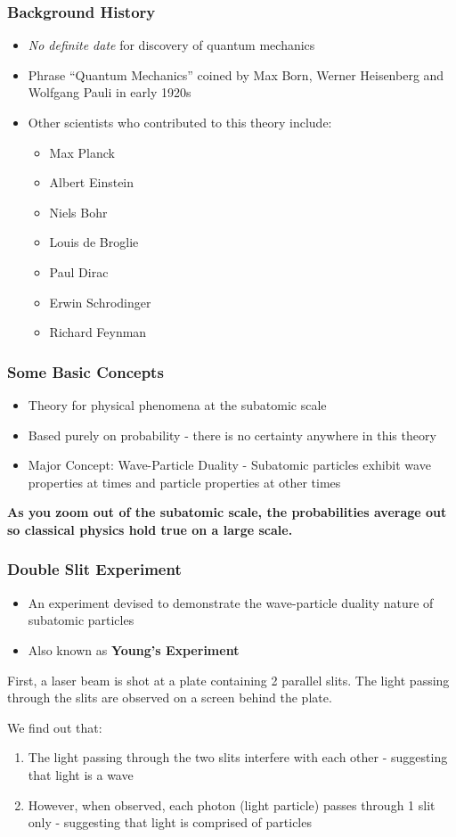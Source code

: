 \documentclass{beamer}
\begin{document}
\begin{frame}
\frametitle{Background History}

\begin{itemize}
\item \emph{No definite date} for discovery of quantum mechanics
\item Phrase ``Quantum Mechanics'' coined by Max Born, Werner Heisenberg and Wolfgang Pauli in early 1920s
\item Other scientists who contributed to this theory include:
\begin{itemize}
\item Max Planck
\item Albert Einstein
\item Niels Bohr
\item Louis de Broglie
\item Paul Dirac
\item Erwin Schrodinger
\item Richard Feynman
\end{itemize}
\end{itemize}

\end{frame}

\begin{frame}
\frametitle{Some Basic Concepts}
\begin{itemize}
\item Theory for physical phenomena at the subatomic scale
\item Based purely on probability - there is no certainty anywhere in this theory
\item Major Concept: Wave-Particle Duality - Subatomic particles exhibit wave properties at times and particle properties at other times
\end{itemize}

\bf{As you zoom out of the subatomic scale, the probabilities average out so classical physics hold true on a large scale.}
\end{frame}

\begin{frame}
\frametitle{Double Slit Experiment}
\begin{itemize}
\item An experiment devised to demonstrate the wave-particle duality nature of subatomic particles
\item Also known as \bf{Young's Experiment}
\end{itemize}

First, a laser beam is shot at a plate containing 2 parallel slits. The light passing through the slits are observed on a screen behind the plate.

We find out that:

\begin{enumerate}
\item The light passing through the two slits interfere with each other - suggesting that light is a wave
\item However, when observed, each photon (light particle) passes through 1 slit only - suggesting that light is comprised of particles
\end{enumerate}

\end{frame}
\end{document}
